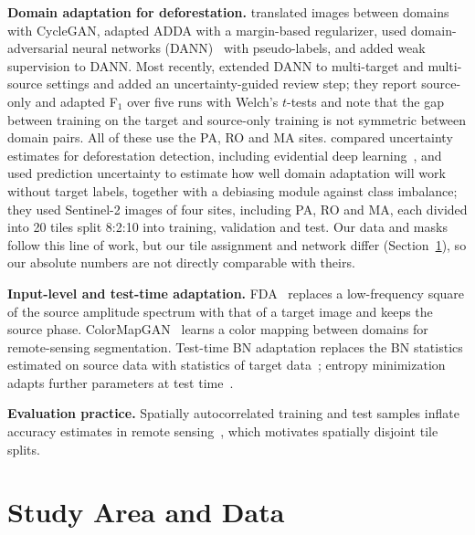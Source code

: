 \documentclass[11pt]{article}
\newcommand{\Fone}{F$_1$}
\begin{document}
\textbf{Domain adaptation for deforestation.}
\citet{sotovega2021unsupervised} translated images between domains with CycleGAN, \citet{noa2021adversarial} adapted ADDA with a margin-based regularizer, \citet{soto2022domain} used domain-adversarial neural networks (DANN)~\citep{ganin2016domain} with pseudo-labels, and \citet{sotovega2023weakly} added weak supervision to DANN.
Most recently, \citet{demoura2025enhancing} extended DANN to multi-target and multi-source settings and added an uncertainty-guided review step; they report source-only and adapted \Fone{} over five runs with Welch's $t$-tests and note that the gap between training on the target and source-only training is not symmetric between domain pairs.
All of these use the PA, RO and MA sites.
\citet{martinez2024enhancing} compared uncertainty estimates for deforestation detection, including evidential deep learning~\citep{sensoy2018evidential}, and \citet{ortega2026domain} used prediction uncertainty to estimate how well domain adaptation will work without target labels, together with a debiasing module against class imbalance; they used Sentinel-2 images of four sites, including PA, RO and MA, each divided into 20 tiles split 8:2:10 into training, validation and test.
Our data and masks follow this line of work, but our tile assignment and network differ (Section~\ref{sec:data}), so our absolute numbers are not directly comparable with theirs.

\textbf{Input-level and test-time adaptation.}
FDA~\citep{yang2020fda} replaces a low-frequency square of the source amplitude spectrum with that of a target image and keeps the source phase.
ColorMapGAN~\citep{tasar2020colormapgan} learns a color mapping between domains for remote-sensing segmentation.
Test-time BN adaptation replaces the BN statistics estimated on source data with statistics of target data~\citep{schneider2020improving,nado2020evaluating}; entropy minimization adapts further parameters at test time~\citep{wang2021tent}.

\textbf{Evaluation practice.}
Spatially autocorrelated training and test samples inflate accuracy estimates in remote sensing~\citep{kattenborn2022spatially}, which motivates spatially disjoint tile splits.

\section{Study Area and Data}\label{sec:data}
\end{document}
